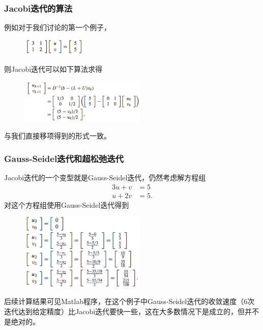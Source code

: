 \documentclass[10pt]{beamer}
\begin{document}
\begin{frame}
\frametitle{Jacobi迭代的算法}
例如对于我们讨论的第一个例子，
\begin{figure}
\includegraphics[width=3cm]{figs/2_5_Jacobi-7} 
\end{figure}
则Jacobi迭代可以如下算法求得
\begin{figure}
\includegraphics[width=6cm]{figs/2_5_Jacobi-8} 
\end{figure}
与我们直接移项得到的形式一致。
\end{frame}


\begin{frame}
\frametitle{Gauss-Seidel迭代和超松弛迭代}
Jacobi迭代的一个变型就是Gauss-Seidel迭代，仍然考虑解方程组
\begin{align}
\label{eq: Jacobi_1}
3u + v &= 5 \nonumber \\
u + 2v &= 5.
\end{align}
对这个方程组使用Gauss-Seidel迭代得到
\begin{figure}
\includegraphics[width=6cm]{figs/2_5_GS-1} 
\end{figure}
后续计算结果可见Matlab程序，在这个例子中Gauss-Seidel迭代的收敛速度（6次迭代达到给定精度）比Jacobi迭代要快一些，这在大多数情况下是成立的，但并不是绝对的。
\end{frame}
\end{document}
